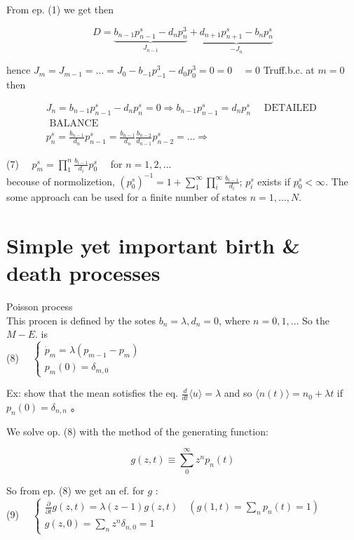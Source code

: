 \documentclass[10pt]{article}
\begin{document}
From ep. (1) we get then

$$
D=\underbrace{b_{n-1} p_{n-1}^{s}-d_{n} p_{n}^{3}}_{J_{n-1}}+\underbrace{d_{n+1} p_{n+1}^{s}-b_{n} p_{n}^{s}}_{-J_{n}}
$$

hence $J_{m}=J_{m-1}=\ldots=J_{0}-b_{-1} p_{-1}^{3}-d_{0} p_{0}^{3}=0 =0 \quad=0$ Truff.b.c. at $m=0$\\
then

$$
\begin{gathered}
J_{n}=b_{n-1} p_{n-1}^{s}-d_{n} p_{n}^{s}=0 \Rightarrow b_{n-1} p_{n-1}^{s}=d_{n} p_{n}^{s} \quad \text { DETAILED } \\
\text { BALANCE } \\
p_{n}^{s}=\frac{b_{n-1}}{d_{n}} p_{n-1}^{s}=\frac{b_{n-1}}{d_{n}} \frac{b_{n-2}}{d_{n-1}} p_{n-2}^{s}=\ldots \Rightarrow
\end{gathered}
$$

(7) $\quad p_{m}^{s}=\prod_{1}^{n} \frac{b_{i-1}}{d_{i}} p_{0}^{s} \quad$ for $n=1,2, \ldots$\\
becouse of normolizetion, $\left(p_{0}^{s}\right)^{-1}=1+\sum_{1}^{\infty} \prod_{i}^{\infty} \frac{b_{i-1}}{d_{i}}$; $p_{i}^{s}$ exists if $p_{0}^{s}<\infty$. The some approach can be used for a finite number of states $n=1, \ldots, N$.

\section*{Simple yet important birth \& death processes}
Poisson process\\
This procen is defined by the sotes $b_{n}=\lambda, d_{n}=0$, where $n=0,1, \ldots$ So the $M-E$. is\\
(8) $\quad\left\{\begin{array}{l}\dot{p}_{m}=\lambda\left(p_{m-1}-p_{m}\right) \\ p_{m}(0)=\delta_{m, 0}\end{array}\right.$

Ex: show that the mean sotisfies the eq. $\frac{d}{d t}\langle u\rangle=\lambda$ and so $\langle n(t)\rangle=n_{0}+\lambda t$ if $p_{n}(0)=\delta_{n, n}$ 。

We solve op. (8) with the method of the generating function:

$$
g(z, t) \equiv \sum_{0}^{\infty} z^{n} p_{n}(t)
$$

So from ep. (8) we get an ef. for $g$ :\\
(9) $\quad\left\{\begin{array}{l}\frac{\partial}{\partial t} g(z, t)=\lambda(z-1) g(z, t) \quad\left(g(1, t)=\sum_{n} p_{n}(t)=1\right) \\ g(z, 0)=\sum_{n} z^{n} \delta_{n, 0}=1\end{array}\right.$
\end{document}
